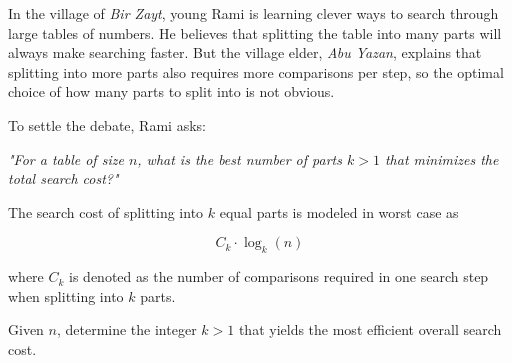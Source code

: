 In the village of \textit{Bir Zayt}, young Rami is learning clever ways to search through large tables of numbers.  
He believes that splitting the table into many parts will always make searching faster.  
But the village elder, \textit{Abu Yazan}, explains that splitting into more parts also requires more comparisons per step,  
so the optimal choice of how many parts to split into is not obvious.

To settle the debate, Rami asks:

\textit{"For a table of size $n$, what is the best number of parts $k>1$  
that minimizes the total search cost?"}

The search cost of splitting into $k$ equal parts is modeled in worst case as

$$ C_k \cdot \log_k(n)$$

where $C_k$ is denoted as the number of comparisons required in one search step when splitting into $k$ parts.

Given $n$, determine the integer $k>1$ that yields the most efficient overall search cost.
